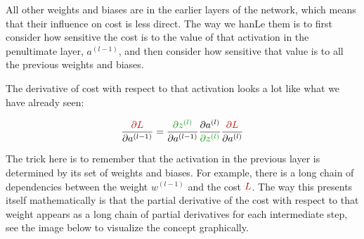 All other weights and biases are in the earlier layers of the network, which means that their influence on cost is less direct. The way we han\partial Le them is to first consider how sensitive the cost is to the value of that activation in the penultimate layer, \( a^{(l-1)} \), and then consider how sensitive that value is to all the previous weights and biases.

The derivative of cost with respect to that activation looks a lot like what we have already seen:

\vspace{-0.5cm}
$$\frac{\textcolor{myred}{\partial L}}{\partial a^{(l-1)}} = \frac{\textcolor{mygreen}{\partial z^{(l)}}}{\partial a^{(l-1)}}  \frac{\partial a^{(l)}}{\textcolor{mygreen}{\partial z^{(l)}}} \frac{\textcolor{myred}{\partial L}}{\partial a^{(l)}}$$

The trick here is to remember that the activation in the previous layer is determined by its set of weights and biases. For example, there is a long chain of dependencies between the weight \( w^{(l-1)} \) and the cost \( \textcolor{myred}{L} \). The way this presents itself mathematically is that the partial derivative of the cost with respect to that weight appears as a long chain of partial derivatives for each intermediate step, see the image below to visualize the concept graphically.

